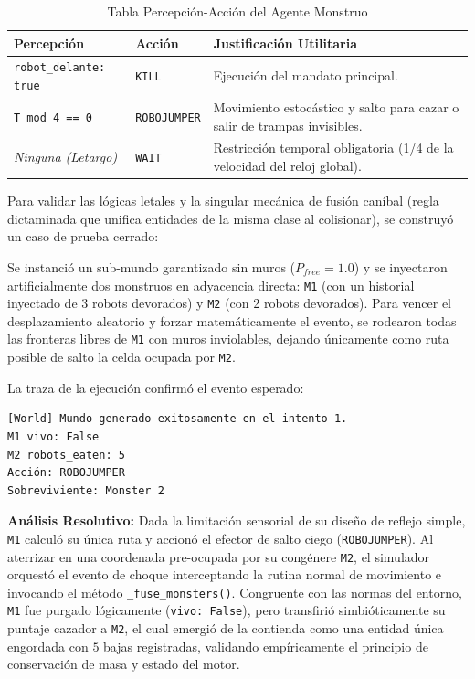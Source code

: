 \documentclass[conference]{IEEEtran}
\begin{document}
\begin{table}[htbp]
\caption{Tabla Percepción-Acción del Agente Monstruo}
\begin{center}
\begin{tabular}{|>{\raggedright\arraybackslash}p{2.6cm}|>{\raggedright\arraybackslash}p{2.2cm}|>{\raggedright\arraybackslash}p{2.7cm}|}
\hline
\textbf{Percepción} & \textbf{Acción} & \textbf{Justificación Utilitaria} \\
\hline
\texttt{robot\_delante: true} & \texttt{KILL} & Ejecución del mandato principal. \\
\hline
\texttt{T mod 4 == 0} & \texttt{ROBOJUMPER} & Movimiento estocástico y salto para cazar o salir de trampas invisibles. \\
\hline
\textit{Ninguna (Letargo)} & \texttt{WAIT} & Restricción temporal obligatoria (1/4 de la velocidad del reloj global). \\
\hline
\end{tabular}
\end{center}
\end{table}

Para validar las lógicas letales y la singular mecánica de fusión caníbal (regla dictaminada que unifica entidades de la misma clase al colisionar), se construyó un caso de prueba cerrado:

Se instanció un sub-mundo garantizado sin muros ($P_{free}=1.0$) y se inyectaron artificialmente dos monstruos en adyacencia directa: \texttt{M1} (con un historial inyectado de 3 robots devorados) y \texttt{M2} (con 2 robots devorados). Para vencer el desplazamiento aleatorio y forzar matemáticamente el evento, se rodearon todas las fronteras libres de \texttt{M1} con muros inviolables, dejando únicamente como ruta posible de salto la celda ocupada por \texttt{M2}. 

La traza de la ejecución confirmó el evento esperado:
{\scriptsize
\begin{verbatim}
[World] Mundo generado exitosamente en el intento 1.
M1 vivo: False
M2 robots_eaten: 5
Acción: ROBOJUMPER
Sobreviviente: Monster 2
\end{verbatim}
}

\textbf{Análisis Resolutivo:}
Dada la limitación sensorial de su diseño de reflejo simple, \texttt{M1} calculó su única ruta y accionó el efector de salto ciego (\texttt{ROBOJUMPER}). Al aterrizar en una coordenada pre-ocupada por su congénere \texttt{M2}, el simulador orquestó el evento de choque interceptando la rutina normal de movimiento e invocando el método \texttt{\_fuse\_monsters()}. Congruente con las normas del entorno, \texttt{M1} fue purgado lógicamente (\texttt{vivo: False}), pero transfirió simbióticamente su puntaje cazador a \texttt{M2}, el cual emergió de la contienda como una entidad única engordada con $5$ bajas registradas, validando empíricamente el principio de conservación de masa y estado del motor.
\end{document}
